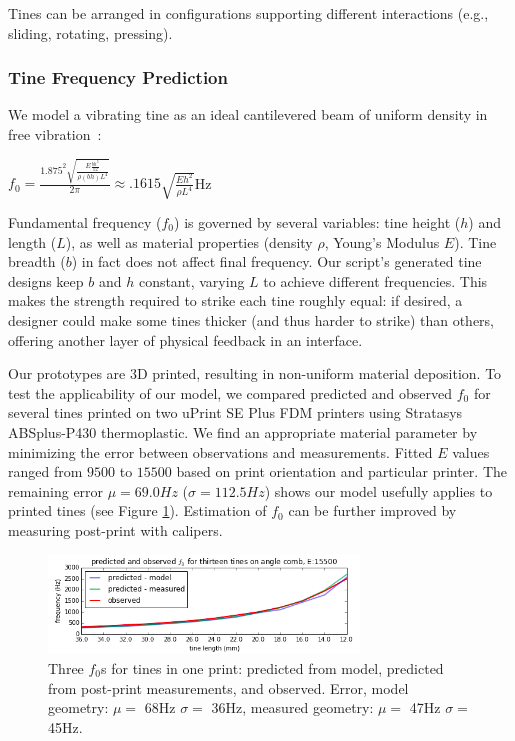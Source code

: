         Tines can be arranged in configurations supporting different interactions (e.g., sliding, rotating, pressing).
        
        \subsubsection{Tine Frequency Prediction}

        We model a vibrating tine as an ideal cantilevered beam of uniform density in free vibration~\cite{meirovitch-analytical}: 

            \begin{center}
             $f_0 = \frac{1.875^2 \sqrt{\frac{E\frac{bh^3}{12}}{\rho (bh)L^4}}}{2\pi} \approx .1615 \sqrt{\frac{Eh^2}{\rho L^4}}$Hz
            \end{center}

            Fundamental frequency ($f_0$) is governed by several variables: tine height ($h$) and length ($L$), as well as material properties (density $\rho$, Young's Modulus $E$). Tine breadth ($b$) in fact does not affect final frequency. Our script's generated tine designs keep $b$ and $h$ constant, varying $L$ to achieve different frequencies. This makes the strength required to strike each tine roughly equal: if desired, a designer could make some tines thicker (and thus harder to strike) than others, offering another layer of physical feedback in an interface.

            Our prototypes are 3D printed, resulting in non-uniform material deposition. To test the applicability of our model, we compared predicted and observed $f_0$ for several tines printed on two uPrint SE Plus FDM printers using Stratasys ABSplus-P430 thermoplastic. We find an appropriate material parameter by minimizing the error between observations and measurements. Fitted $E$ values ranged from $9500$ to $15500$ based on print orientation and particular printer. The remaining error $\mu= 69.0Hz$ ($\sigma= 112.5Hz$) shows our model usefully applies to printed tines (see Figure \ref{fig:lamello-freqsgraph}). Estimation of $f_0$ can be further improved by measuring post-print with calipers.
            
            \begin{figure}[b]
 \centering
    \includegraphics[width=3.25in]{figures/lamello/meirovitch-small.png}
 \caption{Three $f_0$s for tines in one print: predicted from model, predicted from post-print measurements, and observed.  Error, model geometry: $\mu=$ 68Hz $\sigma=$ 36Hz, measured geometry: $\mu=$ 47Hz $\sigma=$ 45Hz.}
 \label{fig:lamello-freqsgraph}
\end{figure}

